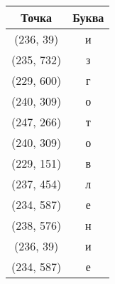 \begin{table}[H]
	\centering
	\begin{tabular}{|c|c|}
		\hline
		Точка & Буква \\ \hline
		(236, 39) & и\\ \hline
		(235, 732) &  з\\ \hline
		(229, 600) & г\\ \hline
		(240, 309) & о\\ \hline
		(247, 266) & т\\ \hline
		(240, 309) &  о\\ \hline
		(229, 151) & в\\ \hline
		(237, 454) & л\\ \hline
		(234, 587) & е\\ \hline
		(238, 576) & н \\ \hline
		(236, 39) & и\\ \hline
		(234, 587) & е\\ \hline
		
	\end{tabular}
\end{table}